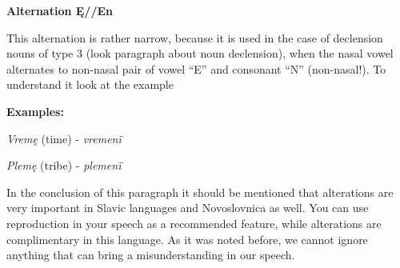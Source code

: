 
\textbf{Alternation Ę//En}

This alternation is rather narrow, because it is used in the case of declension nouns of type 3 (look paragraph about noun declension), when the nasal vowel \textipa{[\~E]} alternates to non-nasal pair of vowel “E” and consonant “N” (non-nasal!). To understand it look at the example

\textbf{Examples:}

\textit{Vremę} (time) \textipa{[‘vrEmj\~E]} - \textit{vremenï} 

\textit{Plemę} (tribe) \textipa{[‘plEmj\~E]} - \textit{plemenï} 

In the conclusion of this paragraph it should be mentioned that alterations are very important in Slavic languages and Novoslovnica as well. You can use reproduction in your speech as a recommended feature, while alterations are complimentary in this language. As it was noted before, we cannot ignore anything that can bring a misunderstanding in our speech. 
